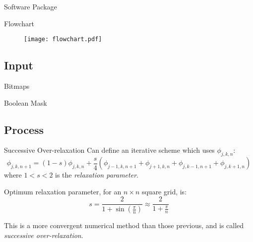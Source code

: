 \documentclass{beamer}
\newcommand{\be}{\begin{equation}}
\newcommand{\ee}{\end{equation}}
\begin{document}
\begin{frame}{Software Package}
\end{frame}

\begin{frame}{Flowchart}
\begin{figure}
\centerline{
\texttt{[image: flowchart.pdf]}
}
\end{figure}
\end{frame}

\subsection{Input}
\begin{frame}{Bitmaps}
\end{frame}

\begin{frame}{Boolean Mask}
\end{frame}

\subsection{Process}

\begin{frame}{Successive Over-relaxation}
Can define an iterative scheme which uses $\phi_{j,k,n}$:
%
\be
\phi_{j,k,n+1}= (1-s)\phi_{j,k,n}+\frac{s}{4}(\phi_{j-1,k,n+1}+\phi_{j+1,k,n}+\phi_{j,k-1,n+1}+\phi_{j,k+1,n})
\ee
%
where $1<s<2$ is the \emph{relaxation parameter}.

Optimum relaxation parameter, for an $n\times n$ square grid, is:
\be
s = \frac{2}{1+\sin(\frac{\pi}{n})} \approx \frac{2}{1+\frac{\pi}{n}}
\ee

This is a more convergent numerical method than those previous, and is called 
\emph{successive over-relaxation}.
\end{frame}
\end{document}
